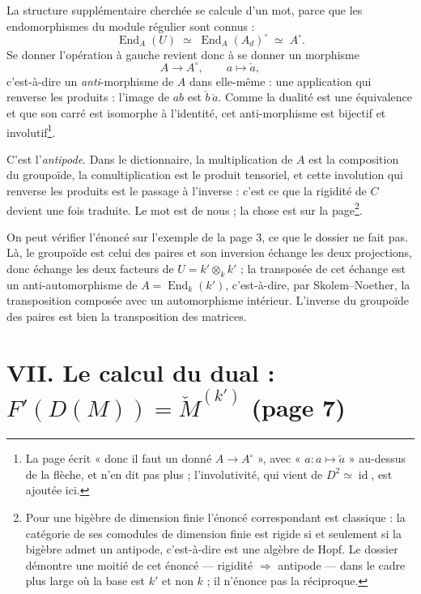 \documentclass[11pt,a4paper]{article}
\begin{document}
La structure supplémentaire cherchée se calcule d'un mot, parce que les
endomorphismes du module régulier sont connus :
\[
\operatorname{End}_{A}(U) \;\simeq\;
\operatorname{End}_{A}(A_{d})^{\circ} \;\simeq\; A^{\circ}.
\]
Se donner l'opération à gauche revient donc à se donner un morphisme
\[
A \longrightarrow A^{\circ},
\qquad a \longmapsto \check{a},
\]
c'est-à-dire un \emph{anti}-morphisme de $A$ dans elle-même : une application
qui renverse les produits : l'image de $ab$ est $\check{b}\,\check{a}$. Comme la
dualité est une équivalence et que son carré est isomorphe à l'identité, cet
anti-morphisme est bijectif et involutif\footnote{La page écrit « donc il faut
un donné $A \to A^{\circ}$ », avec « $a : a \mapsto \check{a}$ » au-dessus de
la flèche, et n'en dit pas plus ; l'involutivité, qui vient de $D^{2} \simeq
\operatorname{id}$, est ajoutée ici.}.

C'est l'\emph{antipode}. Dans le dictionnaire, la multiplication de $A$ est la
composition du groupoïde, la comultiplication est le produit tensoriel, et
cette involution qui renverse les produits est le passage à l'inverse : c'est
ce que la rigidité de $C$ devient une fois traduite. Le mot est de nous ; la
chose est sur la page\footnote{Pour une bigèbre de dimension finie l'énoncé
correspondant est classique : la catégorie de ses comodules de dimension finie
est rigide si et seulement si la bigèbre admet un antipode, c'est-à-dire est
une algèbre de Hopf. Le dossier démontre une moitié de cet énoncé — rigidité
$\Rightarrow$ antipode — dans le cadre plus large où la base est $k'$ et non
$k$ ; il n'énonce pas la réciproque.}.

On peut vérifier l'énoncé sur l'exemple de la page 3, ce que le dossier ne fait
pas. Là, le groupoïde est celui des paires et son inversion échange les deux
projections, donc échange les deux facteurs de $U = k' \otimes_{k} k'$ ; la
transposée de cet échange est un anti-automorphisme de $A =
\operatorname{End}_{k}(k')$, c'est-à-dire, par Skolem--Noether, la transposition
composée avec un automorphisme intérieur. L'inverse du groupoïde des paires est
bien la transposition des matrices.

\section*{VII. Le calcul du dual : $F'(D(M)) = \check{M}^{(k')}$ (page 7)}
\end{document}
